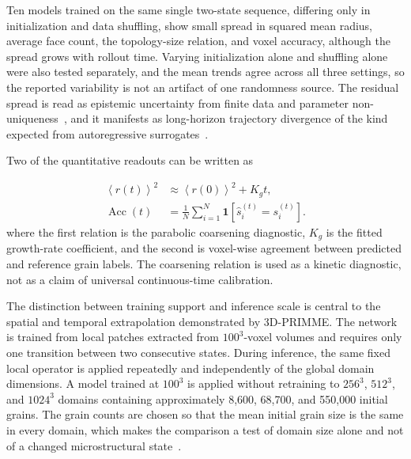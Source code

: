 \documentclass[proposalMode]{ufdissertation}
\begin{document}
Ten models trained on the same single two-state sequence, differing only in initialization and data shuffling, show small spread in squared mean radius, average face count, the topology-size relation, and voxel accuracy, although the spread grows with rollout time. Varying initialization alone and shuffling alone were also tested separately, and the mean trends agree across all three settings, so the reported variability is not an artifact of one randomness source. The residual spread is read as epistemic uncertainty from finite data and parameter non-uniqueness~\cite{hullermeier2021uncertainty}, and it manifests as long-horizon trajectory divergence of the kind expected from autoregressive surrogates~\cite{mccabe2023stability,tian2026threeDprimme}.

Two of the quantitative readouts can be written as

\begin{equation}
\begin{aligned}
\left\langle r(t)\right\rangle^2
&\approx
\left\langle r(0)\right\rangle^2+K_g t,\\
\operatorname{Acc}(t)
&=
\frac{1}{N}
\sum_{i=1}^{N}
\mathbf{1}\!\left[\hat{s}_i^{(t)}=s_i^{(t)}\right].
\end{aligned}
\label{eq:kinetics-accuracy}
\end{equation}
where the first relation is the parabolic coarsening diagnostic, \(K_g\) is the fitted growth-rate coefficient, and the second is voxel-wise agreement between predicted and reference grain labels. The coarsening relation is used as a kinetic diagnostic, not as a claim of universal continuous-time calibration.

The distinction between training support and inference scale is central to the spatial and temporal extrapolation demonstrated by 3D-PRIMME. The network is trained from local patches extracted from \(100^3\)-voxel volumes and requires only one transition between two consecutive states. During inference, the same fixed local operator is applied repeatedly and independently of the global domain dimensions. A model trained at \(100^3\) is applied without retraining to \(256^3\), \(512^3\), and \(1024^3\) domains containing approximately 8,600, 68,700, and 550,000 initial grains. The grain counts are chosen so that the mean initial grain size is the same in every domain, which makes the comparison a test of domain size alone and not of a changed microstructural state~\cite{tian2026threeDprimme}.
\end{document}
